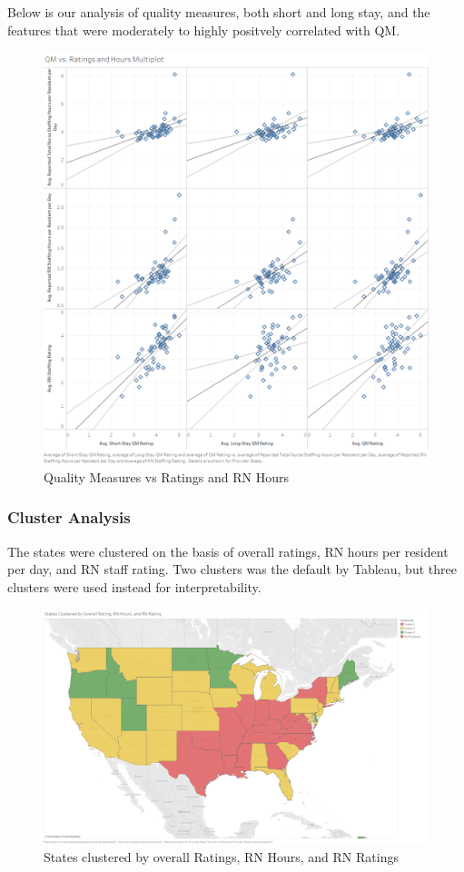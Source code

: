 \documentclass{article}
\theoremstyle{mytheoremstyle}
\theoremstyle{mytheoremstyle}
\theoremstyle{myproblemstyle}
\begin{document}
\pagebreak
Below is our analysis of quality measures, both short and long stay, and the features that were moderately to highly positvely correlated with QM. 
\begin{figure}[htbp]
\centering
\includegraphics[width=\linewidth]{Images/QM vs. Ratings and Hours Multiplot.png}
\caption{Quality Measures vs Ratings and RN Hours}
\label{fig:provEDA}
\end{figure}
\pagebreak
\subsubsection{Cluster Analysis}
The states were clustered on the basis of overall ratings, RN hours per resident per day, and RN staff rating. Two clusters was the default by Tableau, but three clusters were used instead for interpretability.

\begin{figure}[htbp]
\centering
\includegraphics[width=\linewidth]{Images/States Clustered by Overall Rating, RN Hours, and RN Rating.png}
\caption{States clustered by overall Ratings, RN Hours, and RN Ratings}
\label{fig:Clustering by Prov Data}
\end{figure}
\end{document}

